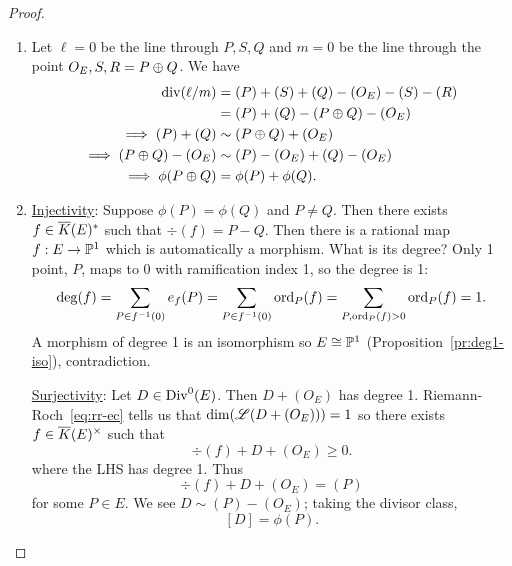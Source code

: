 \begin{proof}
\begin{enumerate}
\item Let $\ell=0$ be the line through $P,S,Q$ and $m=0$ be the line through the point $O_E,S,R=P\oplus Q$. 
We have
\begin{align*}
\operatorname{div}(\ell/m)&=(P)+(S)+(Q)-(O_E)-(S)-(R)\\
&=(P)+(Q)-(P\oplus Q)-(O_E)\\
\implies (P)+(Q)&\sim(P\oplus Q)+(O_E)\\
\implies (P\oplus Q)-(O_E)&\sim (P)-(O_E)+(Q)-(O_E)\\
\implies \phi(P\oplus Q)&=\phi(P)+\phi(Q).
\end{align*}
\item \ul{Injectivity}: Suppose $\phi(P)=\phi(Q)$ and $P\ne Q$. Then there exists $f\in \overline{K}(E)^*$ such that $\div(f)=P-Q$. Then there is a rational map $f:E\to \mathbb{P}^1$ which is automatically a morphism. What is its degree? Only 1 point, $P$, maps to 0 with ramification index 1, so the degree is 1:\[\deg(f)=\sum_{P\in f^{-1}(0)}e_{f}(P)=\sum_{P\in f^{-1}(0)}\operatorname{ord}_P(f)=\sum_{P,\operatorname{ord}_P(f)>0}\operatorname{ord}_P(f)=1.\] A morphism of degree 1 is an isomorphism so $E\cong \mathbb{P}^1$ (Proposition~\ref{pr:deg1-iso}), contradiction.

\ul{Surjectivity}: Let $D\in \operatorname{Div}^0(E)$. Then $D+(O_E)$ has degree 1. Riemann-Roch~\ref{eq:rr-ec} tells us that $\dim(\mathscr{L}(D+(O_E)))=1$ so there exists $f\in \overline{K}(E)^{\times}$ such that 
\[
\div(f)+D+(O_E)\ge 0.
\]
where the LHS has degree 1. Thus
\[
\div(f)+D+(O_E)=(P)
\]
for some $P\in E$. 
We see $D\sim (P)-(O_E)$; taking the divisor class,
\[
[D]=\phi(P).
\]
\end{enumerate}
\end{proof}

%
